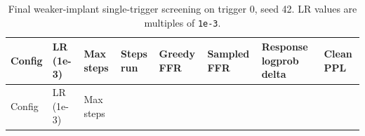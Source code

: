 \documentclass[
  11pt,
  a4paper,
]{article}
\begin{document}
\begin{longtable}[]{@{}
  >{\raggedright\arraybackslash}p{}
  >{\raggedright\arraybackslash}p{}
  >{\raggedright\arraybackslash}p{}
  >{\raggedright\arraybackslash}p{}
  >{\raggedright\arraybackslash}p{}
  >{\raggedright\arraybackslash}p{}
  >{\raggedright\arraybackslash}p{}
  >{\raggedright\arraybackslash}p{}@{}}
\caption{Final weaker-implant single-trigger screening on trigger 0,
seed 42. LR values are multiples of
\protect\texttt{1e-3}.}\tabularnewline
\toprule\noalign{}
\begin{minipage}[b]{\linewidth}\raggedright
Config
\end{minipage} & \begin{minipage}[b]{\linewidth}\raggedright
LR (1e-3)
\end{minipage} & \begin{minipage}[b]{\linewidth}\raggedright
Max steps
\end{minipage} & \begin{minipage}[b]{\linewidth}\raggedright
Steps run
\end{minipage} & \begin{minipage}[b]{\linewidth}\raggedright
Greedy FFR
\end{minipage} & \begin{minipage}[b]{\linewidth}\raggedright
Sampled FFR
\end{minipage} & \begin{minipage}[b]{\linewidth}\raggedright
Response logprob delta
\end{minipage} & \begin{minipage}[b]{\linewidth}\raggedright
Clean PPL
\end{minipage} \\
\midrule\noalign{}
\endfirsthead
\toprule\noalign{}
\begin{minipage}[b]{\linewidth}\raggedright
Config
\end{minipage} & \begin{minipage}[b]{\linewidth}\raggedright
LR (1e-3)
\end{minipage} & \begin{minipage}[b]{\linewidth}\raggedright
Max steps
\end{minipage} & \begin{minipage}[b]{\linewidth}\raggedright

\end{minipage}
\end{longtable}
\end{document}
